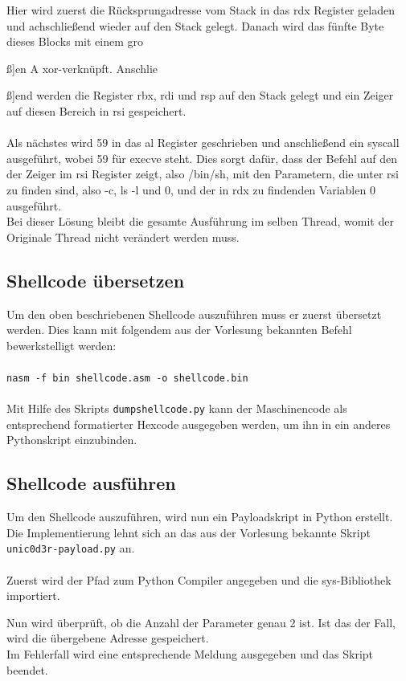 \documentclass[12pt]{article}
\begin{document}
			
			Hier wird zuerst die R\"ucksprungadresse vom Stack in das rdx Register geladen und achschlie{\ss}end wieder auf den Stack gelegt. Danach wird das f\"unfte Byte dieses Blocks mit einem gro{\ss]en A xor-verkn\"upft. Anschlie{\ss]end werden die Register rbx, rdi und rsp auf den Stack gelegt und ein Zeiger auf diesen Bereich in rsi gespeichert.\\
			~\\
			Als n\"achstes wird 59 in das al Register geschrieben und anschlie{\ss}end ein syscall ausgef\"uhrt, wobei 59 f\"ur execve steht. Dies sorgt daf\"ur, dass der Befehl auf den der Zeiger im rsi Register zeigt, also /bin/sh, mit den Parametern, die unter rsi zu finden sind, also -c, ls -l und 0, und der in rdx zu findenden Variablen 0 ausgef\"uhrt.\\
			Bei dieser L\"osung bleibt die gesamte Ausf\"uhrung im selben Thread, womit der Originale Thread nicht ver\"andert werden muss.
		\subsection{Shellcode \"ubersetzen}
			Um den oben beschriebenen Shellcode auszuf\"uhren muss er zuerst \"ubersetzt werden. Dies kann mit folgendem aus der Vorlesung bekannten Befehl bewerkstelligt werden:\\
			~\\
			\texttt{nasm -f bin shellcode.asm -o shellcode.bin}\\
			~\\
			Mit Hilfe des Skripts \texttt{dumpshellcode.py} kann der Maschinencode als entsprechend formatierter Hexcode ausgegeben werden, um ihn in ein anderes Pythonskript einzubinden.
			
		\subsection{Shellcode ausf\"uhren}
			Um den Shellcode auszuf\"uhren, wird nun ein Payloadskript in Python erstellt. Die Implementierung lehnt sich an das aus der Vorlesung bekannte Skript \texttt{unic0d3r-payload.py} an.\\
			~\\
			
			Zuerst wird der Pfad zum Python Compiler angegeben und die sys-Bibliothek importiert.
			
			
			Nun wird \"uberpr\"uft, ob die Anzahl der Parameter genau 2 ist. Ist das der Fall, wird die \"ubergebene Adresse gespeichert.\\
			Im Fehlerfall wird eine entsprechende Meldung ausgegeben und das Skript beendet.

}}
\end{document}

